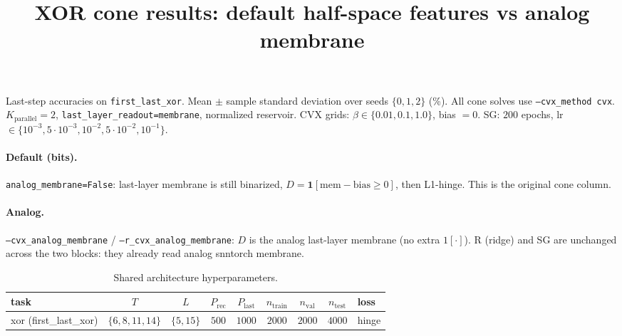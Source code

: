\documentclass[11pt]{article}
\title{XOR cone results: default half-space features vs analog membrane}
\author{}
\date{}
\begin{document}
\maketitle

\noindent Last-step accuracies on \texttt{first\_last\_xor}. Mean $\pm$ sample standard deviation over seeds $\{0,1,2\}$ (\%).
All cone solves use \texttt{--cvx\_method cvx}. $K_{\mathrm{parallel}}=2$, \texttt{last\_layer\_readout=membrane}, normalized reservoir.
CVX grids: $\beta\in\{0.01,0.1,1.0\}$, bias $=0$. SG: $200$ epochs, lr $\in\{10^{-3},5\cdot10^{-3},10^{-2},5\cdot10^{-2},10^{-1}\}$.

\paragraph{Default (bits).}
\texttt{analog\_membrane=False}: last-layer membrane is still binarized,
$D=\mathbf{1}[\mathrm{mem}-\mathrm{bias}\ge 0]$, then L1-hinge. This is the original cone column.

\paragraph{Analog.}
\texttt{--cvx\_analog\_membrane} / \texttt{--r\_cvx\_analog\_membrane}: $D$ is the analog last-layer membrane (no extra $1[\cdot]$).
R (ridge) and SG are unchanged across the two blocks: they already read analog snntorch membrane.

\begin{table}[t]
\centering
\caption{Shared architecture hyperparameters.}
\label{tab:arch}
\begin{tabular}{lcccccccl}
\toprule
task & $T$ & $L$ & $P_{\mathrm{rec}}$ & $P_{\mathrm{last}}$ & $n_{\mathrm{train}}$ & $n_{\mathrm{val}}$ & $n_{\mathrm{test}}$ & loss \\
\midrule
xor (first\_last\_xor) & $\{6,8,11,14\}$ & $\{5,15\}$ & $500$ & $1000$ & $2000$ & $2000$ & $4000$ & hinge \\
\bottomrule
\end{tabular}
\end{table}
\end{document}
